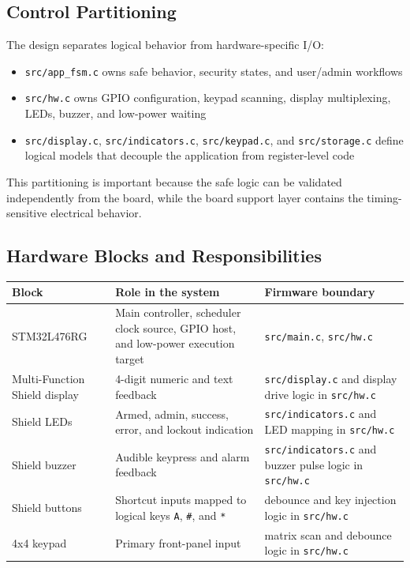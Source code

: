 \documentclass[11pt,a4paper]{article}
\begin{document}
\subsection{Control Partitioning}

The design separates logical behavior from hardware-specific I/O:

\begin{itemize}[leftmargin=1.5em]
\item \texttt{src/app\_fsm.c} owns safe behavior, security states, and user/admin workflows
\item \texttt{src/hw.c} owns GPIO configuration, keypad scanning, display multiplexing, LEDs, buzzer, and low-power waiting
\item \texttt{src/display.c}, \texttt{src/indicators.c}, \texttt{src/keypad.c}, and \texttt{src/storage.c} define logical models that decouple the application from register-level code
\end{itemize}

This partitioning is important because the safe logic can be validated independently from the board,
while the board support layer contains the timing-sensitive electrical behavior.

\subsection{Hardware Blocks and Responsibilities}

\begin{longtable}{p{} p{} p{}}
\toprule
\textbf{Block} & \textbf{Role in the system} & \textbf{Firmware boundary} \\
\midrule
\endhead
STM32L476RG & Main controller, scheduler clock source, GPIO host, and low-power execution target & \texttt{src/main.c}, \texttt{src/hw.c} \\
Multi-Function Shield display & 4-digit numeric and text feedback & \texttt{src/display.c} and display drive logic in \texttt{src/hw.c} \\
Shield LEDs & Armed, admin, success, error, and lockout indication & \texttt{src/indicators.c} and LED mapping in \texttt{src/hw.c} \\
Shield buzzer & Audible keypress and alarm feedback & \texttt{src/indicators.c} and buzzer pulse logic in \texttt{src/hw.c} \\
Shield buttons & Shortcut inputs mapped to logical keys \texttt{A}, \texttt{\#}, and \texttt{*} & debounce and key injection logic in \texttt{src/hw.c} \\
4x4 keypad & Primary front-panel input & matrix scan and debounce logic in \texttt{src/hw.c} \\
\bottomrule
\end{longtable}
\end{document}

